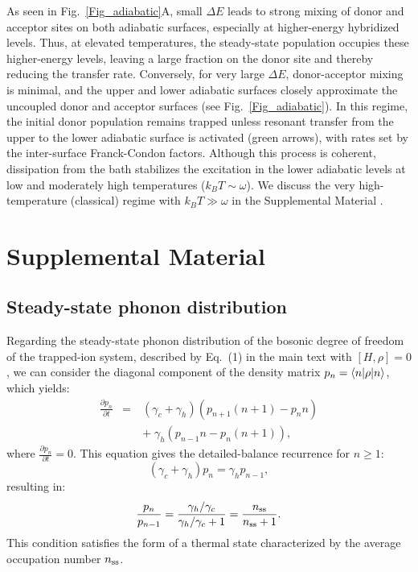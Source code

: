 \documentclass[%
reprint,
superscriptaddress,
amsmath,amssymb,
aps,
prl,
floatfix,
]{revtex4-2}
\begin{document}
As seen in Fig.~\ref{Fig_adiabatic}A, small $\Delta E$ leads to strong mixing of donor and acceptor sites on both adiabatic surfaces, especially at higher-energy hybridized levels. Thus, at elevated temperatures, the steady-state population occupies these higher-energy levels, leaving a large fraction on the donor site and thereby reducing the transfer rate. Conversely, for very large $\Delta E$, donor-acceptor mixing is minimal, and the upper and lower adiabatic surfaces closely approximate the uncoupled donor and acceptor surfaces (see Fig.~\ref{Fig_adiabatic}). In this regime, the initial donor population remains trapped unless resonant transfer from the upper to the lower adiabatic surface is activated (green arrows), with rates set by the inter-surface Franck-Condon factors. Although this process is coherent, dissipation from the bath stabilizes the excitation in the lower adiabatic levels at low and moderately high temperatures ($k_B T \sim \omega$). We discuss the very high-temperature (classical) regime with $k_B T\gg\omega$ in the Supplemental Material \cite{so2025fT_supp}.

\setcounter{figure}{0}
\renewcommand{\figurename}{Figure}
\renewcommand{\thefigure}{S\arabic{figure}}
\setcounter{equation}{0}
\renewcommand{\theequation}{S.\arabic{equation}}
\section*{Supplemental Material}

\subsection*{Steady-state phonon distribution}
\label{app_steady}

Regarding the steady-state phonon distribution of the bosonic degree of freedom of the trapped-ion system, described by Eq.~(1) in the main text \cite{so2025fT} with $[H,\rho]=0$, we can consider the diagonal component of the density matrix $p_n=\braket{n|\rho|n}$, which yields:
\begin{eqnarray}
    \frac{\partial p_n}{\partial t}&=&(\gamma_c+\gamma_h)(p_{n+1}(n+1)-p_n n) \nonumber \\
    &\quad&+\;\gamma_h(p_{n-1} n - p_{n}(n+1)),
\end{eqnarray}
where $\frac{\partial p_n}{\partial t}=0$. This equation gives the detailed-balance recurrence for $n\geq1$:
\begin{equation}
    (\gamma_c+\gamma_h) p_n = \gamma_h p_{n-1},
\end{equation}
resulting in:
\begin{equation}
    \frac{p_{n}}{p_{n-1}}=\frac{\gamma_h/\gamma_c}{\gamma_h/\gamma_c+1}=\frac{n_{\rm ss}}{n_{\rm ss}+1}.
\end{equation}
This condition satisfies the form of a thermal state characterized by the average occupation number $n_{\rm ss}$.
\end{document}
